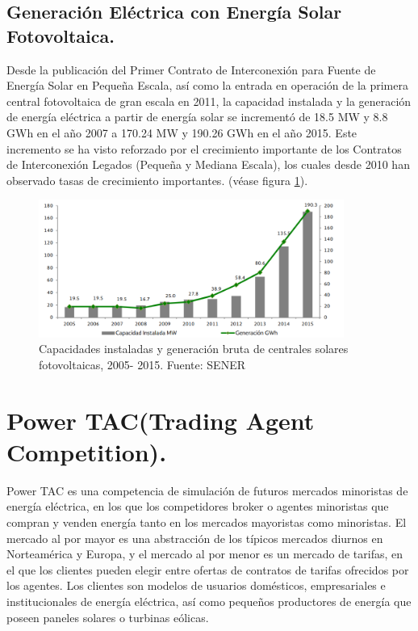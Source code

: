 \subsection{Generación Eléctrica con Energía Solar Fotovoltaica.}
Desde la publicación del Primer Contrato de Interconexión para Fuente de Energía Solar en Pequeña Escala, así como la entrada en operación de la primera central fotovoltaica de gran escala en 2011, la capacidad instalada y la generación de energía eléctrica a partir de energía solar se incrementó de 18.5 MW y 8.8 GWh en el año 2007 a 170.24 MW y 190.26 GWh en el año 2015. Este incremento se ha visto reforzado por el crecimiento importante de los Contratos de Interconexión Legados (Pequeña y Mediana Escala), los cuales desde 2010 han observado tasas de crecimiento importantes. (véase figura \ref{solar}).

\begin{figure}[!h]
	\centering
	\includegraphics[width=10cm]{img/solar.png}
	\caption{Capacidades instaladas y generación bruta de centrales solares fotovoltaicas, 2005- 2015. Fuente: SENER}
	\label{solar}
\end{figure}

\section{Power TAC(Trading Agent Competition).}

Power TAC es una competencia de simulación de futuros mercados minoristas de energía eléctrica, en los que los competidores broker o agentes minoristas que compran y venden energía tanto en los mercados mayoristas como minoristas. El mercado al por mayor es una abstracción de los típicos mercados diurnos en Norteamérica y Europa, y el mercado al por menor es un mercado de tarifas, en el que los clientes pueden elegir entre ofertas de contratos de tarifas ofrecidos por los agentes. Los clientes son modelos de usuarios domésticos, empresariales e institucionales de energía eléctrica, así como pequeños productores de energía que poseen paneles solares o turbinas eólicas.\\

